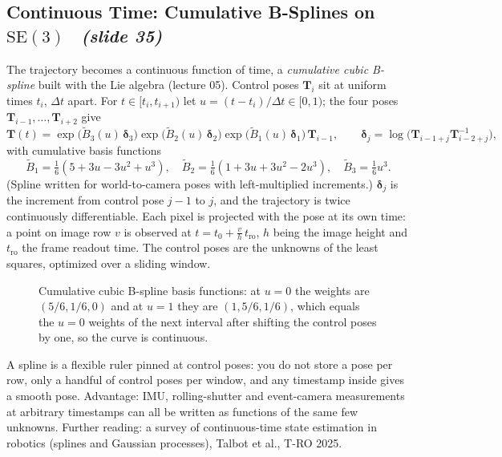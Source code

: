 \documentclass[11pt,a4paper]{article}
\newcommand{\slrs}[1]{\texorpdfstring{\ \emph{(slide #1)}}{ (slide #1)}}
\newcommand{\bT}{\mathbf{T}}
\newcommand{\SE}{\mathrm{SE}(3)}
\begin{document}
\subsection{Continuous Time: Cumulative B-Splines on $\SE$ \slrs{35}}
The trajectory becomes a continuous function of time, a \emph{cumulative cubic B-spline} built with the Lie algebra (lecture 05). Control poses $\bT_i$ sit at uniform times $t_i$, $\Delta t$ apart. For $t\in[t_i,t_{i+1})$ let $u=(t-t_i)/\Delta t\in[0,1)$; the four poses $\bT_{i-1},\dots,\bT_{i+2}$ give
\[
\bT(t)=\exp\!\big(\tilde B_3(u)\,\boldsymbol\delta_3\big)\exp\!\big(\tilde B_2(u)\,\boldsymbol\delta_2\big)\exp\!\big(\tilde B_1(u)\,\boldsymbol\delta_1\big)\,\bT_{i-1},\qquad
\boldsymbol\delta_j=\log\!\big(\bT_{i-1+j}\bT_{i-2+j}^{-1}\big),
\]
with cumulative basis functions
\[
\tilde B_1=\tfrac16(5+3u-3u^2+u^3),\quad \tilde B_2=\tfrac16(1+3u+3u^2-2u^3),\quad \tilde B_3=\tfrac16u^3 .
\]
(Spline written for world-to-camera poses with left-multiplied increments.) $\boldsymbol\delta_j$ is the increment from control pose $j-1$ to $j$, and the trajectory is twice continuously differentiable. Each pixel is projected with the pose at its own time: a point on image row $v$ is observed at $t=t_0+\frac{v}{h}\,t_{\text{ro}}$, $h$ being the image height and $t_{\text{ro}}$ the frame readout time. The control poses are the unknowns of the least squares, optimized over a sliding window.
\begin{figure}[htbp]\centering
{}
\caption{Cumulative cubic B-spline basis functions: at $u=0$ the weights are $(5/6,1/6,0)$ and at $u=1$ they are $(1,5/6,1/6)$, which equals the $u=0$ weights of the next interval after shifting the control poses by one, so the curve is continuous.}
\end{figure}
\begin{intuition}
A spline is a flexible ruler pinned at control poses: you do not store a pose per row, only a handful of control poses per window, and any timestamp inside gives a smooth pose. Advantage: IMU, rolling-shutter and event-camera measurements at arbitrary timestamps can all be written as functions of the same few unknowns. Further reading: a survey of continuous-time state estimation in robotics (splines and Gaussian processes), Talbot et al., T-RO 2025.
\end{intuition}
\end{document}
